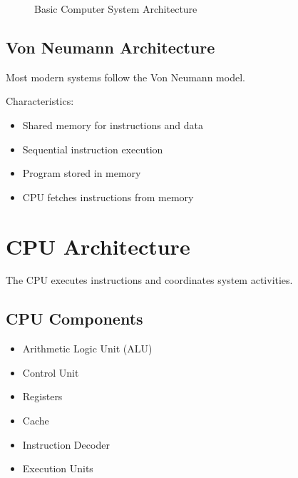 \begin{figure}[H]
\centering
{}
\caption{Basic Computer System Architecture}
\end{figure}

\subsection{Von Neumann Architecture}

Most modern systems follow the Von Neumann model.

Characteristics:

\begin{itemize}
\item Shared memory for instructions and data
\item Sequential instruction execution
\item Program stored in memory
\item CPU fetches instructions from memory
\end{itemize}

\section{CPU Architecture}

The CPU executes instructions and coordinates system activities.

\subsection{CPU Components}

\begin{itemize}
\item Arithmetic Logic Unit (ALU)
\item Control Unit
\item Registers
\item Cache
\item Instruction Decoder
\item Execution Units
\end{itemize}

